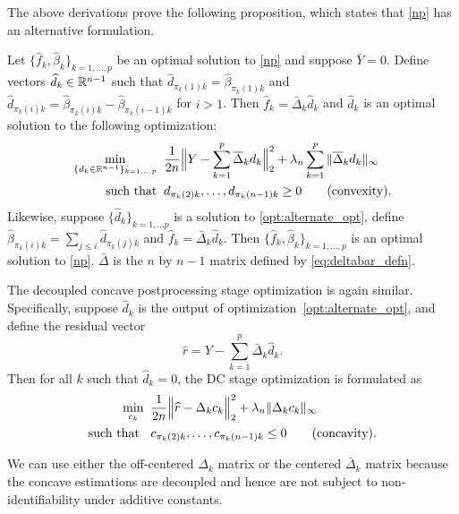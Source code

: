 The above derivations prove the following proposition, which states that \eqref{np} has an alternative formulation.

\begin{proposition} 
\label{prop:alt_opt_form}
Let $\{\hat{f}_k, \hat{\beta}_k\}_{k=1,...,p}$ be an optimal solution to \eqref{np} and suppose $\bar{Y} = 0$. Define vectors $\widehat{d}_k \in {\mathbb R}^{n-1}$ such that $\hat{d}_{\pi_k(1)k} = \hat{\beta}_{\pi_k(1)k}$ and $\hat{d}_{\pi_k(i)k} = \hat{\beta}_{\pi_k(i)k} - \hat{\beta}_{\pi_k(i-1)k}$ for $i > 1$. Then $\hat{f}_k = \bar{\Delta}_k \hat{d}_k$ and $\hat{d}_k$ is an optimal solution to the following optimization:
\begin{align}
\min_{\{d_k \in {\mathbb R}^{n-1}\}_{k=1,...p}}\;\; & \frac{1}{2n} 
       \Bigl\| Y - \sum_{k=1}^p 
              \overline{\Delta}_k d_k \Bigr\|_2^2 
               + \lambda_n \sum_{k=1}^p \|\overline{\Delta}_k d_k \|_\infty   
     \label{opt:alternate_opt} \\
\textrm{such that}\;\;  & d_{\pi_k(2)k}, \ldots , d_{\pi_k(n-1)k} \geq 0  	
               \qquad \textrm{(convexity).} \nonumber 
\end{align}
Likewise, suppose $\{\hat{d}_k\}_{k=1,...p}$ is a solution to \eqref{opt:alternate_opt}, define $\hat{\beta}_{\pi_k(i)k} = \sum_{j\leq i} \hat{d}_{\pi_k(j)k}$ and $\hat{f}_k = \bar{\Delta}_k \hat{d}_k$. Then $\{\hat{f}_k, \hat{\beta}_k\}_{k=1,...,p}$ is an optimal solution to \eqref{np}. $\bar{\Delta}$ is the $n$ by $n-1$ matrix defined by \eqref{eq:deltabar_defn}.

\end{proposition}

The decoupled concave postprocessing stage optimization is again
similar. Specifically, suppose $\hat{d}_k$ is the output of
optimization~\eqref{opt:alternate_opt}, and define the residual vector
\begin{equation}
\hat{r} = Y -
\sum_{k=1}^p \bar{\Delta}_k \hat{d}_k.
\label{eq:residual}
\end{equation}  
Then  for all $k$ such that $\hat{d}_k = 0$, the DC stage optimization is
formulated as
\begin{align}
  \min_{c_k}\;\; & 
      \frac{1}{2n} \Bigl \| \widehat{r} - \Delta_k c_k \Bigr \|_2^2
      + \lambda_n \| \Delta_k c_k \|_\infty 
      \label{opt:alternate_opt_concave}\\
 \textrm{such that }\;\; & c_{\pi_k(2)k}, \ldots, c_{\pi_k(n-1)k} \leq 0 \qquad \textrm{(concavity).} \nonumber
\end{align}

We can use either the off-centered $\Delta_k$ matrix or the centered
$\bar{\Delta}_k$ matrix because the concave estimations are decoupled
and hence are not subject to non-identifiability under additive constants.




